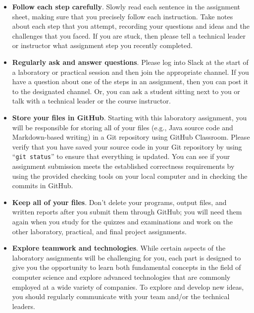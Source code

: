 \documentclass[11pt]{article}
\newcommand{\command}[1]{``\lstinline{#1}''}
\begin{document}
\begin{itemize}
  \setlength{\itemsep}{0pt}

\item {\bf Follow each step carefully}. Slowly read each sentence in the
  assignment sheet, making sure that you precisely follow each instruction. Take
  notes about each step that you attempt, recording your questions and ideas and
  the challenges that you faced. If you are stuck, then please tell a technical
  leader or instructor what assignment step you recently completed.

\item {\bf Regularly ask and answer questions}. Please log into Slack at the
  start of a laboratory or practical session and then join the appropriate
  channel. If you have a question about one of the steps in an assignment, then
  you can post it to the designated channel. Or, you can ask a student sitting
  next to you or talk with a technical leader or the course instructor.

\item {\bf Store your files in GitHub}. Starting with this laboratory
  assignment, you will be responsible for storing all of your files (e.g., Java
  source code and Markdown-based writing) in a Git repository using GitHub
  Classroom. Please verify that you have saved your source code in your Git
  repository by using \command{git status} to ensure that everything is updated.
  You can see if your assignment submission meets the established correctness
  requirements by using the provided checking tools on your local computer and
  in checking the commits in GitHub.

\item {\bf Keep all of your files}. Don't delete your programs, output files,
  and written reports after you submit them through GitHub; you will need them
  again when you study for the quizzes and examinations and work on the other
  laboratory, practical, and final project assignments.

\item {\bf Explore teamwork and technologies}. While certain aspects of the
  laboratory assignments will be challenging for you, each part is designed to
  give you the opportunity to learn both fundamental concepts in the field of
  computer science and explore advanced technologies that are commonly employed
  at a wide variety of companies. To explore and develop new ideas, you should
  regularly communicate with your team and/or the technical leaders.


\end{itemize}
\end{document}

